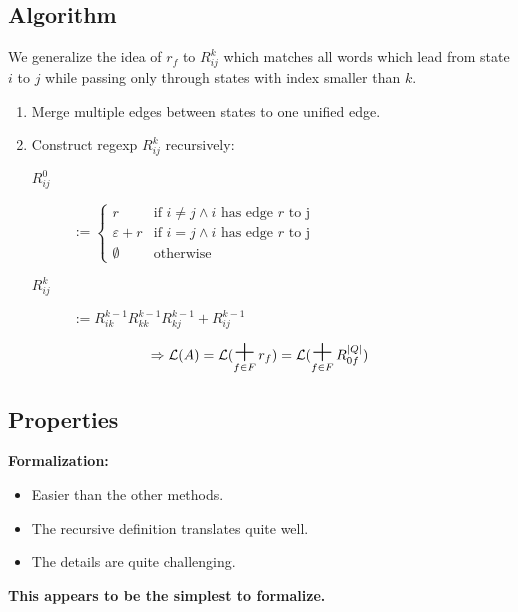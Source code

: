 \documentclass{beamer}
\DeclareMathOperator*{\bigplus}{\mbox{\huge +}}
\begin{document}
\subsection*{Algorithm}
\begin{frame}

    We generalize the idea of $r_f$ to $R^k_{i j}$ which matches all words which lead from state $i$ to $j$ while passing only through states with index smaller than $k$.

    \begin{enumerate}
        \item 
            Merge multiple edges between states to one unified edge.
        \item
            Construct regexp $R^k_{i j}$ recursively:

            \begin{description}

                \item[$R^0_{i j}$]
                    $ := \begin{cases} 
                        r & \mbox{if } i \neq j \wedge i \mbox{ has edge } r \mbox{ to j}  \\
          \varepsilon + r & \mbox{if } i = j \wedge i \mbox{ has edge } r \mbox{ to j}  \\
                \emptyset & \mbox{otherwise}
                    \end{cases}
                    $ 

                \item[$R^k_{i j}$]
                    $ := R^{k-1}_{i k} R^{k-1}_{k k} R^{k-1}_{k j} + R^{k-1}_{i j}$

            \end{description}

    \end{enumerate}

    \[ 
        \Rightarrow \mathcal{L}(A) = \mathcal{L}(\bigplus_{f \in F} r_f) = \mathcal{L}(\bigplus_{f \in F} R^{|Q|}_{0 f}) 
    \]

\end{frame}

\subsection*{Properties}
\begin{frame}
    \textbf{Formalization:} \\
    \begin{itemize}
        \item
            Easier than the other methods.\\
        \item
            The recursive definition translates quite well.\\
        \item
            The details are quite challenging.
    \end{itemize} 

    \pause

    {\centering 
        \textbf{This appears to be the simplest to formalize.}

    }
\end{frame}
\end{document}
